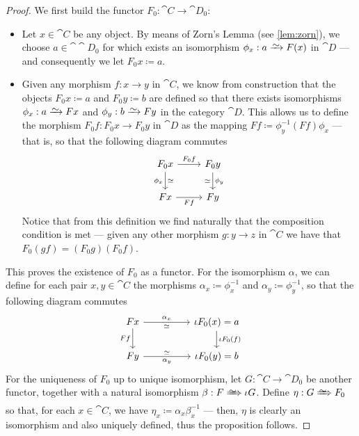 \begin{proof}
We first build the functor \(F_0: \cat C \to \cat D_0\):
\begin{itemize}\setlength\itemsep{0em}
\item Let \(x \in \cat C\) be any object. By means of Zorn's Lemma (see
  \cref{lem:zorn}), we choose \(a \in \cat \cat D_0\) for which exists an
  isomorphism \(\phi_x: a \isoto F(x)\) in \(\cat D\) --- and consequently we let
  \(F_0 x \coloneq a\).
\item Given any morphism \(f: x \to y\) in \(\cat C\), we know from construction
  that the objects \(F_0 x \coloneq a\) and \(F_0 y \coloneq b\) are defined so
  that there exists isomorphisms \(\phi_x: a \isoto F x\) and \(\phi_y: b \isoto
  F y\) in the category \(\cat D\). This allows us to define the morphism \(F_0
  f: F_0 x \to F_0 y\) in \(\cat D\) as the mapping \(F f \coloneq \phi_y^{-1} (F
  f) \phi_x\) --- that is, so that the following diagram commutes
  \[
    \begin{tikzcd}
      F_0 x \ar[r, "F_0 f"] \ar[d, "\dis", "\phi_x"']
      &F_0 y \ar[d, "\dis"', "\phi_y"] \\
      F x \ar[r, swap, "F f"] &F y
    \end{tikzcd}
  \]
  Notice that from this definition we find naturally that the composition
  condition is met --- given any other morphism \(g: y \to z\) in \(\cat C\) we
  have that \(F_0(g f) = (F_0 g)(F_0 f)\).
\end{itemize}
This proves the existence of \(F_0\) as a functor. For the isomorphism
\(\alpha\), we can define for each pair \(x, y \in \cat C\) the morphisms
\(\alpha_x \coloneq \phi_x^{-1}\) and \(\alpha_y \coloneq \phi_y^{-1}\), so that
the following diagram commutes
\[
  \begin{tikzcd}
    F x \ar[rr, "\alpha_x", "\dis"'] \ar[d, swap, "F f"]
    & &\iota F_0(x) = a \ar[d, "\iota F_0 (f)"] \\
    F y \ar[rr, "\alpha_y"', "\dis"]
    & &\iota F_0(y) = b
  \end{tikzcd}
\]
For the uniqueness of \(F_0\) up to unique isomorphism, let \(G: \cat C \to \cat
D_0\) be another functor, together with a natural isomorphism \(\beta: F \isonat
\iota G\). Define \(\eta: G \isonat F_0\) so that, for each \(x \in \cat C\), we
have \(\eta_x \coloneq \alpha_x \beta_{x}^{-1}\) --- then, \(\eta\) is clearly an
isomorphism and also uniquely defined, thus the proposition follows.
\end{proof}
